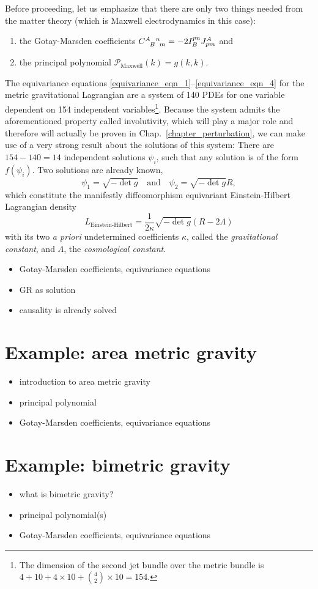 Before proceeding, let us emphasize that there are only two things needed from the matter theory (which is Maxwell electrodynamics in this case):
\begin{enumerate}
  \item the Gotay-Marsden coefficients $\gmc{A}{B}{n}{m} = -2 I_B^{pn} J^A_{pm}$ and
  \item the principal polynomial $\mathcal P_\text{Maxwell}(k) = g(k,k)$.
\end{enumerate}

The equivariance equations \eqref{equivariance_eqn_1}--\eqref{equivariance_eqn_4} for the metric gravitational Lagrangian are a system of 140 PDEs for one variable dependent on 154 independent variables\footnote{The dimension of the second jet bundle over the metric bundle is $4+10+4\times 10 + \binom{4}{2}\times 10=154$.}. Because the system admits the aforementioned property called involutivity, which will play a major role and therefore will actually be proven in Chap.~\ref{chapter_perturbation}, we can make use of a very strong result about the solutions of this system\cite{seiler}: There are $154-140=14$ independent solutions $\psi_i$, such that any solution is of the form $f(\psi_i)$. Two solutions are already known,
\begin{equation}
  \psi_1 = \sqrt{-\operatorname{det}g}\quad\text{and}\quad \psi_2 = \sqrt{-\operatorname{det}g}R,
\end{equation}
which constitute the manifestly diffeomorphism equivariant Einstein-Hilbert Lagrangian density
\begin{equation}
  L_\text{Einstein-Hilbert} = \frac{1}{2\kappa} \sqrt{-\operatorname{det}g}(R - 2\Lambda)
\end{equation}
with its two \emph{a priori} undetermined coefficients $\kappa$, called the \emph{gravitational constant}, and $\Lambda$, the \emph{cosmological constant}.

\begin{itemize}
\item Gotay-Marsden coefficients, equivariance equations
\item GR as solution
\item causality is already solved
\end{itemize}

\section{Example: area metric gravity}
\begin{itemize}
\item introduction to area metric gravity
\item principal polynomial
\item Gotay-Marsden coefficients, equivariance equations
\end{itemize}

\section{Example: bimetric gravity}
\begin{itemize}
\item what is bimetric gravity?
\item principal polynomial(s)
\item Gotay-Marsden coefficients, equivariance equations
\end{itemize}

